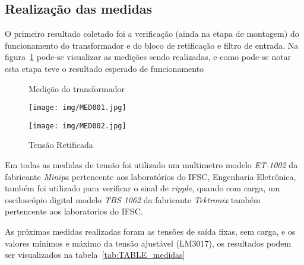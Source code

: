 \documentclass[
	article,			%
	11pt,				%
	oneside,			%
	a4paper,			%
	english,			%
	brazil,				%
	sumario=tradicional
	]{abntex2}
\begin{document}
\subsection{Realização das medidas}
O primeiro resultado coletado foi a verificação (ainda na etapa de montagem) do funcionamento do transformador e do bloco de retificação e filtro de entrada. Na figura~\ref{fig:FIG_MEDTRAFO} pode-se visualizar as medições sendo realizadas, e como pode-se notar esta etapa teve o resultado esperado de funcionamento
\begin{figure}[htb!]
   \centering
   \begin{minipage}{0.4\textwidth}
   		\centering
   		\caption{Medição do transformador} \label{MED001}
   		\texttt{[image: img/MED001.jpg]}
   \end{minipage}
   \hspace{1.5cm}
   \begin{minipage}{0.4\textwidth}
   		\centering
   		\caption{Tensão Retificada} \label{MED002}
   		\texttt{[image: img/MED002.jpg]} 
   \end{minipage}
   \label{fig:FIG_MEDTRAFO}
\end{figure}

Em todas as medidas de tensão foi utilizado um multimetro modelo \textit{ET-1002} da fabricante \textit{Minipa} pertencente aos laboratórios do IFSC, Engenharia Eletrônica, também foi utilizado para verificar o sinal de \textit{ripple}, quando com carga, um osciloscópio digital modelo \textit{TBS 1062} da fabricante \textit{Tektronix} também pertencente aos laboratorios do IFSC.

As próximas medidas realizadas foram as tensões de saída fixas, sem carga, e os valores mínimos e máximo da tensão ajustável (LM3017), os resultados podem ser visualizados na tabela~\ref{tab:TABLE_medidas}
\end{document}
